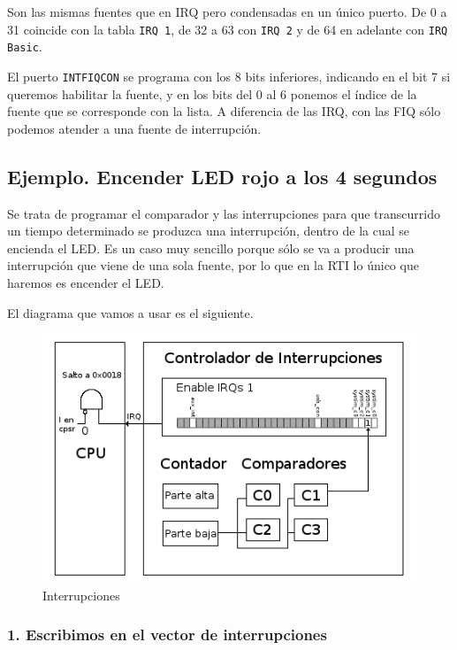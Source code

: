 Son las mismas fuentes que en IRQ pero condensadas en un único puerto. De 0 a 31 coincide
con la tabla {\tt IRQ 1}, de 32 a 63 con {\tt IRQ 2} y de 64 en adelante con {\tt IRQ Basic}.

El puerto {\tt INTFIQCON} se programa con los 8 bits inferiores, indicando en el bit 7 si
queremos habilitar la fuente, y en los bits del 0 al 6 ponemos el índice de la fuente que
se corresponde con la lista. A diferencia de las IRQ, con las FIQ sólo podemos atender a
una fuente de interrupción. 

\subsection{Ejemplo. Encender LED rojo a los 4 segundos}

Se trata de programar el comparador y las interrupciones para que
transcurrido un tiempo determinado se produzca una interrupción, dentro
de la cual se encienda el LED. Es un caso muy sencillo porque sólo
se va a producir una interrupción que viene de una sola fuente, por
lo que en la RTI lo único que haremos es encender el LED.

El diagrama que vamos a usar es el siguiente.

\begin{figure}[h]
  \centering
    \includegraphics[width=14cm]{graphs/inter1.png}
  \caption{Interrupciones}
  \label{fig:inter1}
\end{figure}

\subsubsection{1. Escribimos en el vector de interrupciones}

